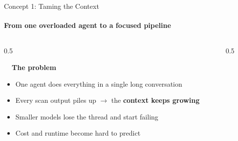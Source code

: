 \begin{frame}{Concept 1: Taming the Context}
    \framesubtitle{From one overloaded agent to a focused pipeline}

    \begin{columns}[T,onlytextwidth]
        \begin{column}{0.5\textwidth}
             {
                \textbf{\faExclamationTriangle~~The problem}
                \begin{itemize}
                    \item \scriptsize One agent does everything in a single long conversation
                    \item \scriptsize Every scan output piles up $\rightarrow$ the \textbf{context keeps growing}
                    \item \scriptsize Smaller models lose the thread and start failing
                    \item \scriptsize Cost and runtime become hard to predict
                \end{itemize}
            }
        \end{column}

        \begin{column}{0.5\textwidth}
        \end{column}
    \end{columns}

\end{frame}


